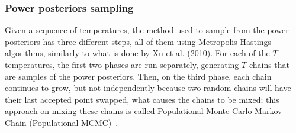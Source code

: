 \subsubsection{Power posteriors sampling}
\label{sec:power_posteriors_sampling}
Given a sequence of temperatures, the method used to sample from the
power posteriors has three different steps, all of them using 
Metropolis-Hastings algorithms, similarly to what is done by Xu et al. 
(2010). For each of the $T$ temperatures, the first two phases are
run separately, generating $T$ chains that are samples of the power 
posteriors. Then, on the third phase, each chain continues to grow, but
not independently because two random chains will have their last accepted 
point swapped, what causes the chains to be mixed; this approach on 
mixing these chains is called Populational Monte Carlo Markov 
Chain (Populational MCMC)~\cite{Friel2008}.

